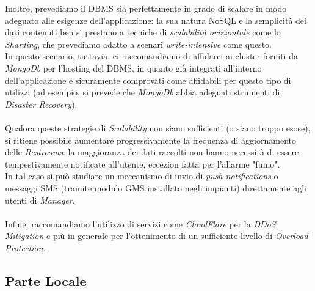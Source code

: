 \documentclass[12pt]{article}
\begin{document}
Inoltre, prevediamo il DBMS sia perfettamente in grado di scalare in modo adeguato alle esigenze dell'applicazione: la sua natura NoSQL e la semplicità dei dati contenuti ben si prestano a tecniche di \textit{scalabilità orizzontale} come lo \textit{Sharding}, che prevediamo adatto a scenari \textit{write-intensive} come questo.\\
In questo scenario, tuttavia, ci raccomandiamo di affidarci ai cluster  forniti da \textit{MongoDb} per l'hosting del DBMS, in quanto già integrati all'interno dell'applicazione e sicuramente comprovati come affidabili per questo tipo di utilizzi (ad esempio, si prevede che \textit{MongoDb} abbia adeguati strumenti di \textit{Disaster Recovery}).\\\\
Qualora queste strategie di \textit{Scalability} non siano sufficienti (o siano troppo esose), si ritiene possibile aumentare progressivamente la frequenza di aggiornamento delle \textit{Restrooms}: la maggioranza dei dati raccolti non hanno necessità di essere tempestivamente notificate all'utente, eccezion fatta per l'allarme "fumo".\\ 
In tal caso si può studiare un meccanismo di invio di \textit{push notifications} o messaggi SMS (tramite modulo GMS installato negli impianti) direttamente agli utenti di \textit{Manager}.\\\\
Infine, raccomandiamo l'utilizzo di servizi come \textit{CloudFlare} per la \textit{DDoS Mitigation} e più in generale per l'ottenimento di un sufficiente livello di \textit{Overload Protection}.
\subsection{Parte Locale}
\end{document}
